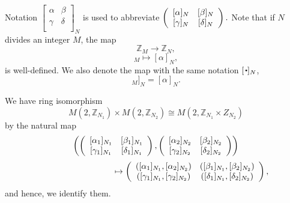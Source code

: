 \documentclass[12pt]{iopart}
\newcommand{\sbt}{\,\begin{picture}(-1,1)(-1,-3)\circle*{2}\end{picture}\ }
\begin{document}
Notation \(
\left[\begin{array}{cc}
\alpha & \beta \\
\gamma & \delta \\
\end{array}\right]_N
\)
is used to abbreviate
\(\displaystyle
\left(\begin{array}{cc}
[\alpha]_N & [\beta]_N \\\relax
[\gamma]_N & [\delta]_N \\
\end{array}\right).
\)
%
Note that if \(N\) divides an integer \(M\), the map
\begin{equation}
\mathbb Z_M\rightarrow\mathbb Z_N,
\end{equation}
\begin{equation}
[\alpha]_M\mapsto[\alpha]_N,
\end{equation}
is well-defined.
%
We also denote the map with the same notation \([\sbt]_N\),
\begin{equation}
[[\alpha]_M]_N=[\alpha]_N.
\end{equation}

We have ring isomorphism
\begin{equation}
M(2,\mathbb Z_{N_1})\times M(2,\mathbb Z_{N_2})
\cong
M(2,\mathbb Z_{N_1}\times Z_{N_2})
\end{equation}
by the natural map
\[
\left(
\left(\begin{array}{cc}
[\alpha_1]_{N_1} & [\beta_1]_{N_1} \\\relax
[\gamma_1]_{N_1} & [\delta_1]_{N_1} \\
\end{array}\right),
\left(\begin{array}{cc}
[\alpha_2]_{N_2} & [\beta_2]_{N_2} \\\relax
[\gamma_2]_{N_2} & [\delta_2]_{N_2} \\
\end{array}\right)
\right)
\]
\begin{equation}
\hspace{30mm}
\mapsto
\left(\begin{array}{cc}
([\alpha_1]_{N_1},[\alpha_2]_{N_2}) & ([\beta_1]_{N_1},[\beta_2]_{N_2}) \\
([\gamma_1]_{N_1},[\gamma_2]_{N_2}) & ([\delta_1]_{N_1},[\delta_2]_{N_2}) \\
\end{array}\right),
\end{equation}
and hence, we identify them.
\end{document}

